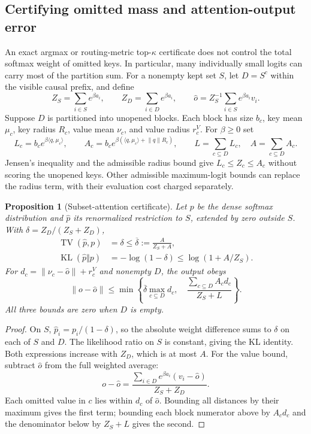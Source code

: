 \documentclass[11pt]{article}
\numberwithin{equation}{section}
\newtheorem{proposition}{Proposition}
\newcommand{\inner}[2]{\langle #1, #2\rangle}
\begin{document}
\subsection{Certifying omitted mass and attention-output error}\label{sec:output-cert}

An exact argmax or routing-metric top-$\kappa$ certificate does not control the total softmax weight
of omitted keys. In particular, many individually small logits can carry most of the partition sum.
For a nonempty kept set $S$, let $D=S^c$ within the visible causal prefix, and define
\[
 Z_S=\sum_{i\in S}e^{\beta a_i},\qquad
 Z_D=\sum_{i\in D}e^{\beta a_i},\qquad
 \widehat o=Z_S^{-1}\sum_{i\in S}e^{\beta a_i}v_i .
\]
Suppose $D$ is partitioned into unopened blocks. Each block has size $b_c$, key mean $\mu_c$,
key radius $R_c$, value mean $\nu_c$, and value radius $r_c^V$. For $\beta\ge0$ set
\begin{equation}\label{eq:partition-cert}
 L_c=b_c e^{\beta\inner{q}{\mu_c}},\qquad
 A_c=b_c e^{\beta(\inner{q}{\mu_c}+\lVert q\rVert R_c)},\qquad
 L=\sum_{c\subseteq D}L_c,\quad A=\sum_{c\subseteq D}A_c .
\end{equation}
Jensen's inequality and the admissible radius bound give $L_c\le Z_c\le A_c$ without scoring
the unopened keys. Other admissible maximum-logit bounds can replace the radius term, with their
evaluation cost charged separately.

\begin{proposition}[Subset-attention certificate]\label{prop:output-cert}
Let $p$ be the dense softmax distribution and $\widehat p$ its renormalized restriction to $S$,
extended by zero outside $S$. With $\delta=Z_D/(Z_S+Z_D)$,
\begin{align}
 \operatorname{TV}(\widehat p,p)&=\delta\le\overline\delta:=\frac{A}{Z_S+A},\label{eq:mass-cert}\\
 \operatorname{KL}(\widehat p\Vert p)&=-\log(1-\delta)
       \le\log(1+A/Z_S).\label{eq:kl-cert}
\end{align}
For $d_c=\lVert\nu_c-\widehat o\rVert+r_c^V$ and nonempty $D$, the output obeys
\begin{equation}\label{eq:value-cert}
 \lVert o-\widehat o\rVert\le
 \min\left\{\overline\delta\max_{c\subseteq D}d_c,\quad
       \frac{\sum_{c\subseteq D}A_c d_c}{Z_S+L}\right\}.
\end{equation}
All three bounds are zero when $D$ is empty.
\end{proposition}
\begin{proof}
On $S$, $\widehat p_i=p_i/(1-\delta)$, so the absolute weight difference sums to $\delta$ on
each of $S$ and $D$. The likelihood ratio on $S$ is constant, giving the KL identity.
Both expressions increase with $Z_D$, which is at most $A$. For the value bound, subtract
$\widehat o$ from the full weighted average:
\[
 o-\widehat o=\frac{\sum_{i\in D}e^{\beta a_i}(v_i-\widehat o)}{Z_S+Z_D}.
\]
Each omitted value in $c$ lies within $d_c$ of $\widehat o$. Bounding all distances by their
maximum gives the first term; bounding each block numerator above by $A_c d_c$ and the
denominator below by $Z_S+L$ gives the second.
\end{proof}
\end{document}
